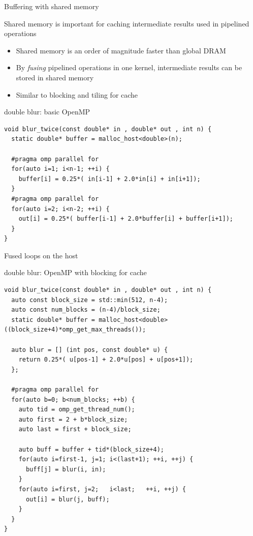 \begin{frame}[fragile]{Buffering with shared memory}
    \begin{info}{}
        Shared memory is important for caching intermediate results used in pipelined operations
        \begin{itemize}
            \item Shared memory is an order of magnitude faster than global DRAM
            \item By \emph{fusing} pipelined operations in one kernel, intermediate results can be stored in shared memory
            \item Similar to blocking and tiling for cache
        \end{itemize}
    \end{info}


    \begin{code}{double blur: basic OpenMP}
        \begin{lstlisting}[style=boxcudatiny]
void blur_twice(const double* in , double* out , int n) {
  static double* buffer = malloc_host<double>(n);

  #pragma omp parallel for
  for(auto i=1; i<n-1; ++i) {
    buffer[i] = 0.25*( in[i-1] + 2.0*in[i] + in[i+1]);
  }
  #pragma omp parallel for
  for(auto i=2; i<n-2; ++i) {
    out[i] = 0.25*( buffer[i-1] + 2.0*buffer[i] + buffer[i+1]);
  }
}
        \end{lstlisting}
    \end{code}

\end{frame}

\begin{frame}[fragile]{Fused loops on the host}
    \begin{code}{double blur: OpenMP with blocking for cache}
        \begin{lstlisting}[style=boxcudatiny]
void blur_twice(const double* in , double* out , int n) {
  auto const block_size = std::min(512, n-4);
  auto const num_blocks = (n-4)/block_size;
  static double* buffer = malloc_host<double>((block_size+4)*omp_get_max_threads());

  auto blur = [] (int pos, const double* u) {
    return 0.25*( u[pos-1] + 2.0*u[pos] + u[pos+1]);
  };

  #pragma omp parallel for
  for(auto b=0; b<num_blocks; ++b) {
    auto tid = omp_get_thread_num();
    auto first = 2 + b*block_size;
    auto last = first + block_size;

    auto buff = buffer + tid*(block_size+4);
    for(auto i=first-1, j=1; i<(last+1); ++i, ++j) {
      buff[j] = blur(i, in);
    }
    for(auto i=first, j=2;   i<last;   ++i, ++j) {
      out[i] = blur(j, buff);
    }
  }
}
        \end{lstlisting}
    \end{code}
\end{frame}

